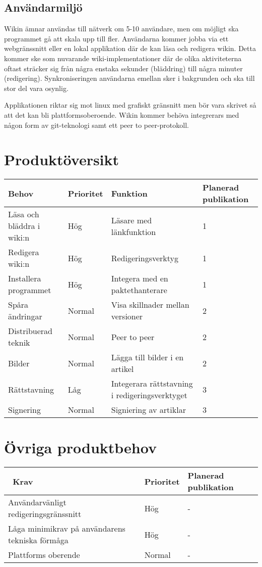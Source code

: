 \subsection{Användarmiljö}
Wikin ämnar användas till nätverk om 5-10 användare, men om möjligt ska programmet gå att skala upp till fler. Användarna kommer jobba via ett webgränssnitt eller en lokal applikation där de kan läsa och redigera wikin. Detta kommer ske som nuvarande wiki-implementationer där de olika aktiviteterna oftast sträcker sig från några enstaka sekunder (bläddring) till några minuter (redigering). Synkroniseringen användarna emellan sker i bakgrunden och ska till stor del vara osynlig.

Applikationen riktar sig mot linux med grafiskt gränsnitt men bör vara skrivet så att det kan bli plattformsoberoende. Wikin kommer behöva integrerars med någon form av git-teknologi samt ett peer to peer-protokoll.
\section{Produktöversikt}
\begin{tabular}{|l|l|l|l|}
\hline
Behov & Prioritet & Funktion & Planerad publikation \\
\hline
Läsa och bläddra i wiki:n & Hög & Läsare med länkfunktion & 1 \\
\hline
Redigera wiki:n & Hög & Redigeringsverktyg & 1 \\
\hline
Installera programmet & Hög & Integera med en paktethanterare & 1 \\
\hline
Spåra ändringar & Normal & Visa skillnader mellan versioner & 2 \\
\hline
Distribuerad teknik & Normal & Peer to peer & 2 \\
\hline 
Bilder & Normal & Lägga till bilder i en artikel & 2 \\
\hline
Rättstavning & Låg & Integerara rättstavning i redigeringsverktyget & 3 \\
\hline
Signering & Normal & Signiering av artiklar & 3 \\
\hline
\end{tabular}
\section{Övriga produktbehov}
\begin{tabular}{|l|l|l|}
\hline\
Krav & Prioritet & Planerad publikation \\
\hline
Användarvänligt redigeringsgränssnitt & Hög & - \\
\hline
Låga minimikrav på användarens tekniska förmåga & Hög & - \\
\hline
Plattforms oberende & Normal & - \\
\hline
\end{tabular}

